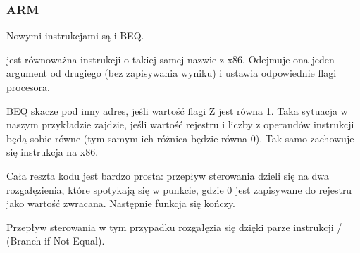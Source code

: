 \subsubsection{ARM}





Nowymi instrukcjami są \CMP i \ac{BEQ}.

\CMP jest równoważna instrukcji o takiej samej nazwie z x86. Odejmuje ona jeden argument od drugiego (bez zapisywania wyniku) i ustawia odpowiednie flagi procesora.

\ac{BEQ} skacze pod inny adres, jeśli wartość flagi Z jest równa 1. Taka sytuacja w naszym przykładzie zajdzie, jeśli wartość rejestru i liczby z operandów instrukcji \CMP będą sobie równe (tym samym ich różnica będzie równa 0).
Tak samo zachowuje się instrukcja \JZ na x86.

Cała reszta kodu jest bardzo prosta: przepływ sterowania dzieli się na dwa rozgałęzienia, które spotykają się w punkcie, gdzie 0 jest zapisywane do rejestru  jako wartość zwracana. Następnie funkcja się kończy.




Przepływ sterowania w tym przypadku rozgałęzia się dzięki parze instrukcji / (Branch if Not Equal).


